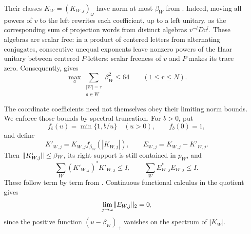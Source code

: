 Their classes \(K_W=(K_{W,j})_\omega\) have norm at most
\(\beta_W\) from .
Indeed, moving all powers of \(v\) to the left rewrites each
coefficient, up to a left unitary, as the corresponding sum of
projection words from distinct algebras \(v^{-l}Dv^l\).
These algebras are scalar free: in a product of centered letters
from alternating conjugates, consecutive unequal exponents leave
nonzero powers of the Haar unitary between centered \(P\)-letters;
scalar freeness of \(v\) and \(P\) makes its trace zero.
Consequently,  gives
\begin{equation}\label{eq:beta-through-label}
 \max_a\sum_{\substack{|W|=r\\a\in W}}\beta_W^2\le64
 \qquad(1\le r\le N).
\end{equation}

The coordinate coefficients need not themselves obey their limiting
norm bounds. We enforce those bounds by spectral truncation. For
\(b>0\), put
\[
 f_b(u)=\min\{1,b/u\}\quad(u>0),\qquad f_b(0)=1,
\]
and define
\[
 K'_{W,j}=K_{W,j}f_{\beta_W}(|K_{W,j}|),\qquad
 E_{W,j}=K_{W,j}-K'_{W,j}.
\]
Then \(\lVert K'_{W,j}\rVert\le\beta_W\), its right support is still
contained in \(p_W\), and
\begin{equation}\label{eq:clipped-columns}
 \sum_W(K'_{W,j})^*K'_{W,j}\le I,\qquad
 \sum_WE_{W,j}^*E_{W,j}\le I.
\end{equation}
These follow term by term from .
Continuous functional calculus in the quotient gives
\[
 \lim_{j\to\omega}\lVert E_{W,j}\rVert_2=0,
\]
since the positive function \((u-\beta_W)_+\) vanishes on
the spectrum of \(|K_W|\).

